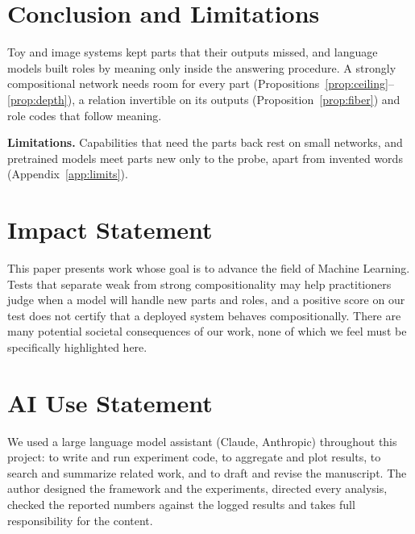 \documentclass{article}
\theoremstyle{plain}
\theoremstyle{remark}
\begin{document}
\section{Conclusion and Limitations}
\label{sec:discussion}

Toy and image systems kept parts that their outputs missed, and language models built roles by meaning only inside the answering procedure. A strongly compositional network needs room for every part (Propositions~\ref{prop:ceiling}--\ref{prop:depth}), a relation invertible on its outputs (Proposition~\ref{prop:fiber}) and role codes that follow meaning.

\textbf{Limitations.} Capabilities that need the parts back rest on small networks, and pretrained models meet parts new only to the probe, apart from invented words (Appendix~\ref{app:limits}).

\section*{Impact Statement}

This paper presents work whose goal is to advance the field of Machine Learning. Tests that separate weak from strong compositionality may help practitioners judge when a model will handle new parts and roles, and a positive score on our test does not certify that a deployed system behaves compositionally. There are many potential societal consequences of our work, none of which we feel must be specifically highlighted here.

\section*{AI Use Statement}

We used a large language model assistant (Claude, Anthropic) throughout this project: to write and run experiment code, to aggregate and plot results, to search and summarize related work, and to draft and revise the manuscript. The author designed the framework and the experiments, directed every analysis, checked the reported numbers against the logged results and takes full responsibility for the content.




\newpage
\appendix
\onecolumn
\end{document}
